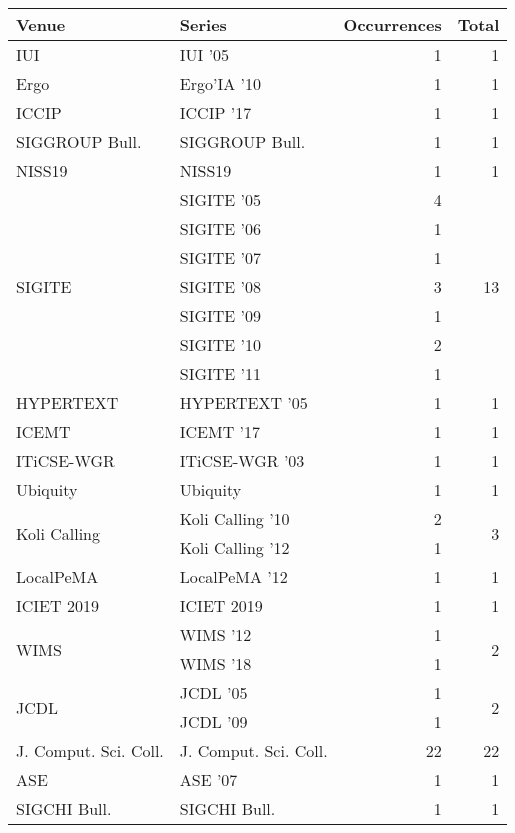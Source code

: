 \begin{table*}[t]
\begin{tabular}{llrr}
Venue & Series & Occurrences & Total\\\hline
\multirow{1}{*}{IUI } & IUI '05 & 1 & \multirow{1}{*}{1}\\
\multirow{1}{*}{Ergo} & Ergo'IA '10 & 1 & \multirow{1}{*}{1}\\
\multirow{1}{*}{ICCIP } & ICCIP '17 & 1 & \multirow{1}{*}{1}\\
\multirow{1}{*}{SIGGROUP Bull.} & SIGGROUP Bull. & 1 & \multirow{1}{*}{1}\\
\multirow{1}{*}{NISS19} & NISS19 & 1 & \multirow{1}{*}{1}\\
\multirow{7}{*}{SIGITE } & SIGITE '05 & 4 & \multirow{7}{*}{13}\\
& SIGITE '06 & 1 &\\
& SIGITE '07 & 1 &\\
& SIGITE '08 & 3 &\\
& SIGITE '09 & 1 &\\
& SIGITE '10 & 2 &\\
& SIGITE '11 & 1 &\\
\multirow{1}{*}{HYPERTEXT } & HYPERTEXT '05 & 1 & \multirow{1}{*}{1}\\
\multirow{1}{*}{ICEMT } & ICEMT '17 & 1 & \multirow{1}{*}{1}\\
\multirow{1}{*}{ITiCSE-WGR } & ITiCSE-WGR '03 & 1 & \multirow{1}{*}{1}\\
\multirow{1}{*}{Ubiquity} & Ubiquity & 1 & \multirow{1}{*}{1}\\
\multirow{2}{*}{Koli Calling } & Koli Calling '10 & 2 & \multirow{2}{*}{3}\\
& Koli Calling '12 & 1 &\\
\multirow{1}{*}{LocalPeMA } & LocalPeMA '12 & 1 & \multirow{1}{*}{1}\\
\multirow{1}{*}{ICIET 2019} & ICIET 2019 & 1 & \multirow{1}{*}{1}\\
\multirow{2}{*}{WIMS } & WIMS '12 & 1 & \multirow{2}{*}{2}\\
& WIMS '18 & 1 &\\
\multirow{2}{*}{JCDL } & JCDL '05 & 1 & \multirow{2}{*}{2}\\
& JCDL '09 & 1 &\\
\multirow{1}{*}{J. Comput. Sci. Coll.} & J. Comput. Sci. Coll. & 22 & \multirow{1}{*}{22}\\
\multirow{1}{*}{ASE } & ASE '07 & 1 & \multirow{1}{*}{1}\\
\multirow{1}{*}{SIGCHI Bull.} & SIGCHI Bull. & 1 & \multirow{1}{*}{1}\\

\end{tabular}
\end{table*}
